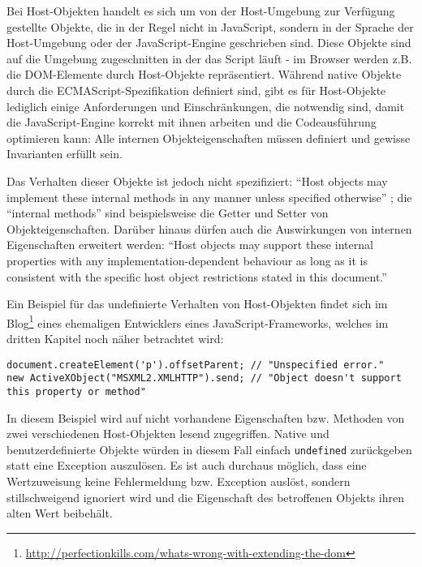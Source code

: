 Bei Host-Objekten handelt es sich um von der Host-Umgebung zur Verfügung gestellte Objekte, die in
der Regel nicht in JavaScript, sondern in der Sprache der Host-Umgebung oder der JavaScript-Engine
geschrieben sind. Diese Objekte sind auf die Umgebung zugeschnitten in der das Script läuft - im
Browser werden z.B. die DOM-Elemente durch Host-Objekte repräsentiert.
Während native Objekte durch die ECMAScript-Spezifikation definiert sind, gibt es für Host-Objekte
lediglich einige Anforderungen und Einschränkungen, die notwendig sind, damit die JavaScript-Engine
korrekt mit ihnen arbeiten und die Codeausführung optimieren kann: Alle internen Objekteigenschaften
müssen definiert und gewisse Invarianten erfüllt sein.

Das Verhalten dieser Objekte ist jedoch nicht
spezifiziert: \enquote{Host objects may implement these internal methods in any manner unless specified
otherwise} \citep[Kap. 8.6.2]{ecmascript}; die \enquote{internal methods} sind beispielsweise die Getter
und Setter von Objekteigenschaften. Darüber hinaus dürfen auch die Auswirkungen von internen
Eigenschaften erweitert werden: \enquote{Host objects may support these internal properties with any
implementation-dependent behaviour as long as it is consistent with the specific host object
restrictions stated in this document.} \citep[Kap. 8.6.2]{ecmascript}

Ein Beispiel für das undefinierte Verhalten von Host-Objekten findet sich im
Blog\footnote{\href{http://perfectionkills.com/whats-wrong-with-extending-the-dom}{http://perfectionkills.com/whats-wrong-with-extending-the-dom}}
eines ehemaligen Entwicklers eines JavaScript-Frameworks, welches im dritten Kapitel noch näher
betrachtet wird:

\begin{lstlisting}[caption=Verhalten von Host-Objekten im Internet Explorer]
document.createElement('p').offsetParent; // "Unspecified error."
new ActiveXObject("MSXML2.XMLHTTP").send; // "Object doesn't support this property or method"
\end{lstlisting}

In diesem Beispiel wird auf nicht vorhandene Eigenschaften bzw. Methoden von zwei verschiedenen
Host-Objekten lesend zugegriffen. Native und benutzerdefinierte Objekte würden in diesem Fall
einfach \lstinline{undefined} zurückgeben statt eine Exception auszulösen.
Es ist auch durchaus möglich, dass eine Wertzuweisung keine Fehlermeldung bzw. Exception auslöst,
sondern stillschweigend ignoriert wird und die Eigenschaft des betroffenen Objekts ihren alten Wert
beibehält.


